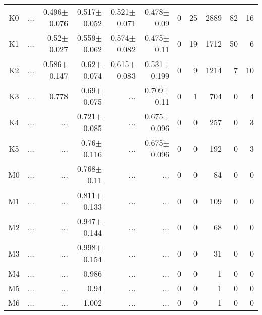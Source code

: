 \begin{table}[t]
\begin{center}
\begin{tabular}{c|rrrrr|rrrrr}
K0	&	 ...	&	0.496$\pm$0.076	&	0.517$\pm$0.052	&	0.521$\pm$0.071	&	0.478$\pm$0.09	&	0	&	25	&	2889	&	82	&	16	\\
K1	&	 ...	&	0.52$\pm$0.027	&	0.559$\pm$0.062	&	0.574$\pm$0.082	&	0.475$\pm$0.11	&	0	&	19	&	1712	&	50	&	6	\\
K2	&	 ...	&	0.586$\pm$0.147	&	0.62$\pm$0.074	&	0.615$\pm$0.083	&	0.531$\pm$0.199	&	0	&	9	&	1214	&	7	&	10	\\
K3	&	 ...	&	0.778	&	0.69$\pm$0.075	&	 ...	&	0.709$\pm$0.11	&	0	&	1	&	704	&	0	&	4	\\
K4	&	 ...	&	 ...	&	0.721$\pm$0.085	&	 ...	&	0.675$\pm$0.096	&	0	&	0	&	257	&	0	&	3	\\
K5	&	 ...	&	 ...	&	0.76$\pm$0.116	&	 ...	&	0.675$\pm$0.096	&	0	&	0	&	192	&	0	&	3	\\
M0	&	 ...	&	 ...	&	0.768$\pm$0.11	&	 ...	&	 ...	&	0	&	0	&	84	&	0	&	0	\\
M1	&	 ...	&	 ...	&	0.811$\pm$0.133	&	 ...	&	 ...	&	0	&	0	&	109	&	0	&	0	\\
M2	&	 ...	&	 ...	&	0.947$\pm$0.144	&	 ...	&	 ...	&	0	&	0	&	68	&	0	&	0	\\
M3	&	 ...	&	 ...	&	0.998$\pm$0.154	&	 ...	&	 ...	&	0	&	0	&	31	&	0	&	0	\\
M4	&	 ...	&	 ...	&	0.986	&	 ...	&	 ...	&	0	&	0	&	1	&	0	&	0	\\
M5	&	 ...	&	 ...	&	0.94	&	 ...	&	 ...	&	0	&	0	&	1	&	0	&	0	\\
M6	&	 ...	&	 ...	&	1.002	&	 ...	&	 ...	&	0	&	0	&	1	&	0	&	0	\\
    \bottomrule
    \end{tabular}
\end{center}
\end{table}


